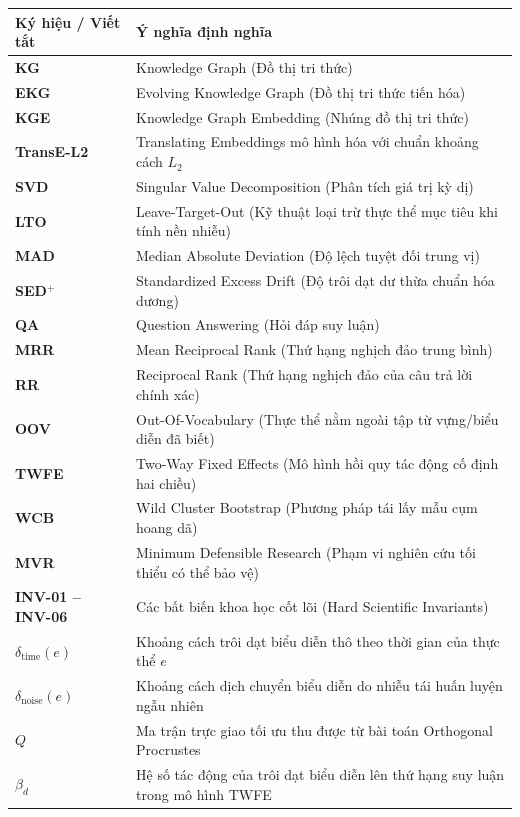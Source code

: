 \documentclass[12pt,a4paper,oneside]{report}
\theoremstyle{definition}
\theoremstyle{plain}
\theoremstyle{remark}
\begin{document}
\begin{table}[h!]
\centering
\begin{tabularx}{\textwidth}{lX}
\toprule
\textbf{Ký hiệu / Viết tắt} & \textbf{Ý nghĩa định nghĩa} \\
\midrule
\textbf{KG} & Knowledge Graph (Đồ thị tri thức) \\
\textbf{EKG} & Evolving Knowledge Graph (Đồ thị tri thức tiến hóa) \\
\textbf{KGE} & Knowledge Graph Embedding (Nhúng đồ thị tri thức) \\
\textbf{TransE-L2} & Translating Embeddings mô hình hóa với chuẩn khoảng cách $L_2$ \\
\textbf{SVD} & Singular Value Decomposition (Phân tích giá trị kỳ dị) \\
\textbf{LTO} & Leave-Target-Out (Kỹ thuật loại trừ thực thể mục tiêu khi tính nền nhiễu) \\
\textbf{MAD} & Median Absolute Deviation (Độ lệch tuyệt đối trung vị) \\
\textbf{SED}$^+$ & Standardized Excess Drift (Độ trôi dạt dư thừa chuẩn hóa dương) \\
\textbf{QA} & Question Answering (Hỏi đáp suy luận) \\
\textbf{MRR} & Mean Reciprocal Rank (Thứ hạng nghịch đảo trung bình) \\
\textbf{RR} & Reciprocal Rank (Thứ hạng nghịch đảo của câu trả lời chính xác) \\
\textbf{OOV} & Out-Of-Vocabulary (Thực thể nằm ngoài tập từ vựng/biểu diễn đã biết) \\
\textbf{TWFE} & Two-Way Fixed Effects (Mô hình hồi quy tác động cố định hai chiều) \\
\textbf{WCB} & Wild Cluster Bootstrap (Phương pháp tái lấy mẫu cụm hoang dã) \\
\textbf{MVR} & Minimum Defensible Research (Phạm vi nghiên cứu tối thiểu có thể bảo vệ) \\
\textbf{INV-01 -- INV-06} & Các bất biến khoa học cốt lõi (Hard Scientific Invariants) \\
$\delta_{\text{time}}(e)$ & Khoảng cách trôi dạt biểu diễn thô theo thời gian của thực thể $e$ \\
$\delta_{\text{noise}}(e)$ & Khoảng cách dịch chuyển biểu diễn do nhiễu tái huấn luyện ngẫu nhiên \\
$Q$ & Ma trận trực giao tối ưu thu được từ bài toán Orthogonal Procrustes \\
$\beta_d$ & Hệ số tác động của trôi dạt biểu diễn lên thứ hạng suy luận trong mô hình TWFE \\
\bottomrule
\end{tabularx}
\end{table}
\end{document}
